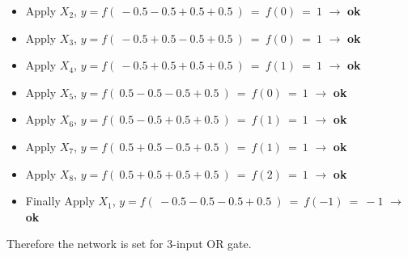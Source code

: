 \documentclass[12pt]{article}
\begin{document}
\begin{itemize}
{		}
	
		\item Apply $X_2$, $y = f(\ -0.5 - 0.5 + 0.5 + 0.5\ ) \ = \ f(0) \ = \ 1 $ $\rightarrow$ \textbf{ok}
		
		\item Apply $X_3$, $y = f(\ -0.5 + 0.5 - 0.5 + 0.5\ ) \ = \ f(0) \ = \ 1 $ $\rightarrow$ \textbf{ok}
		
		\item Apply $X_4$, $y = f(\ -0.5 + 0.5 + 0.5 + 0.5\ ) \ = \ f(1) \ = \ 1 $ $\rightarrow$ \textbf{ok}
		
		\item Apply $X_5$, $y = f(\ 0.5 - 0.5 - 0.5 + 0.5\ ) \ = \ f(0) \ = \ 1 $ $\rightarrow$ \textbf{ok}
		
		\item Apply $X_6$, $y = f(\ 0.5 - 0.5 + 0.5 + 0.5\ ) \ = \ f(1) \ = \ 1 $ $\rightarrow$ \textbf{ok}
		
		\item Apply $X_7$, $y = f(\ 0.5 + 0.5 - 0.5 + 0.5\ ) \ = \ f(1) \ = \ 1 $ $\rightarrow$ \textbf{ok}
		
		\item Apply $X_8$, $y = f(\ 0.5 + 0.5 + 0.5 + 0.5\ ) \ = \ f(2) \ = \ 1 $ $\rightarrow$ \textbf{ok}
		
		\item Finally Apply $X_1$, $y = f(\ -0.5 - 0.5 - 0.5 + 0.5\ ) \ = \ f(-1) \ = \ -1 $ $\rightarrow$ \textbf{ok}
	
\end{itemize}

Therefore the network is set for 3-input OR gate.
\end{document}

